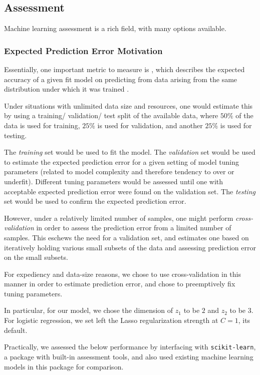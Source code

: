 \subsection{Assessment}

Machine learning assessment is a rich field, with many options available.

\subsubsection{Expected Prediction Error Motivation}

Essentially, one important metric to measure is , which describes the expected accuracy of a given fit model on predicting from data arising from the same distribution under which it was trained \cite{friedman_elements_2001}.

Under situations with unlimited data size and resources, one would estimate this by using a training/ validation/ test split of the available data, where $50\%$ of the data is used for training, $25\%$ is used for validation, and another $25\%$ is used for testing.

The \textit{training} set would be used to fit the model. The \textit{validation} set would be used to estimate the expected prediction error for a given setting of model tuning parameters (related to model complexity and therefore tendency to over or underfit). Different tuning parameters would be assessed until one with acceptable expected prediction error were found on the validation set. The \textit{testing} set would be used to confirm the expected prediction error.

However, under a relatively limited number of samples, one might perform \textit{cross-validation} in order to assess the prediction error from a limited number of samples. This eschews the need for a validation set, and estimates one based on iteratively holding various small subsets of the data and assessing prediction error on the small subsets.

For expediency and data-size reasons, we chose to use cross-validation in this manner in order to estimate prediction error, and chose to preemptively fix tuning parameters.

In particular, for our model, we chose the dimension of $z_1$ to be $2$ and $z_2$ to be $3$. For logistic regression, we set left the Lasso regularization strength at $C=1$, its default.

Practically, we assessed the below performance by interfacing with \texttt{scikit-learn}\cite{pedregosa_scikit-learn:_2011}, a package with built-in assessment tools, and also used existing machine learning models in this package for comparison. 


